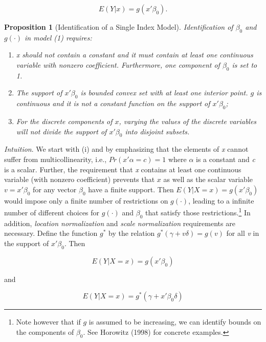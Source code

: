 \documentclass[a4paper]{article}
\begin{document}
\begin{equation}
E(Y|x) = g(x'\beta_0).
\end{equation}

\newtheorem{prop}{Proposition}[section]

\begin{prop}[Identification of a Single Index Model] 
Identification of $\beta_0$ and $g(\cdot)$ in model (1) requires:
\begin{enumerate}[label=(\roman*)]
\item x should not contain a constant and it must contain at least one continuous variable with nonzero coefficient. Furthermore, one component of $\beta_0$ is set to 1. 
\item The support of $x'\beta_0$ is bounded convex set with at least one interior point. $g$  is continuous and it is not a constant function on the support of $x'\beta_0$;
\item For the discrete components of $x$, varying the values of the discrete variables will not divide the support of $x'\beta_0$ into disjoint subsets.
\end{enumerate}
\end{prop}

\textit{Intuition}. We start with (i) and by emphasizing that the elements of \textit{x} cannot suffer from multicollinearity, i.e., $Pr(x'\alpha = c) = 1$ where $\alpha$ is a constant and \textit{c }is a scalar. Further, the requirement that \textit{x} contains at least one continuous variable (with nonzero coefficient) prevents that $x$ as well as the scalar variable $ v = x'\beta_0 $ for any vector $\beta_0$ have a finite support. Then $E(Y|X = x) = g(x'\beta_0)$ would impose only a finite number of restrictions  on $g(\cdot)$, leading to a infinite number of different choices for $g(\cdot)$ and $\beta_0$ that satisfy those restrictions.\footnote{Note however that if $g$ is assumed to be increasing, we can identify bounds on the components of $\beta_0$. See Horowitz (1998) for  concrete examples.} In addition, \textit{location normalization} and \textit{scale normalization} requirements are necessary. Define the function $g^{*}$ by the relation $g^{*}(\gamma + v\delta) = g(v)$ for all \textit{v} in the support of $x'\beta_0$. Then

\begin{equation}
E(Y|X = x) = g(x'\beta_0)
\end{equation}

and

\begin{equation}
E(Y|X = x) = g^*(\gamma + x'\beta_0\delta)
\end{equation}
\end{document}
